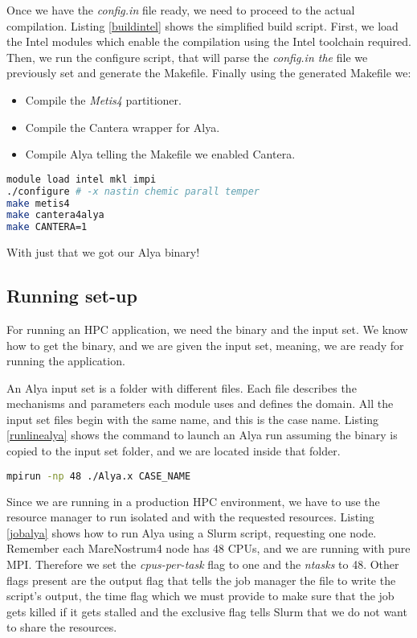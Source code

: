 Once we have the \textit{config.in} file ready, we need to proceed to the actual compilation. Listing \ref{buildintel} shows the simplified build script. First, we load the Intel modules which enable the compilation using the Intel toolchain required. Then, we run the configure script, that will parse the \textit{config.in the} file we previously set and generate the Makefile. Finally using the generated Makefile we:

\begin{itemize}
  \item Compile the \textit{Metis4} partitioner.
  \item Compile the Cantera wrapper for Alya.
  \item Compile Alya telling the Makefile we enabled Cantera.
\end{itemize}

\begin{lstlisting}[language=sh, caption={Building Alya}, label={buildintel}]
module load intel mkl impi
./configure # -x nastin chemic parall temper
make metis4
make cantera4alya 
make CANTERA=1
\end{lstlisting}

With just that we got our Alya binary!

\subsection{Running set-up}

For running an HPC application, we need the binary and the input set. We know how to get the binary, and we are given the input set, meaning, we are ready for running the application.

An Alya input set is a folder with different files. Each file describes the mechanisms and parameters each module uses and defines the domain. All the input set files begin with the same name, and this is the case name. Listing \ref{runlinealya} shows the command to launch an Alya run assuming the binary is copied to the input set folder, and we are located inside that folder.

\begin{lstlisting}[language=sh, caption={Running Alya with 48 processes.}, label={runlinealya}]
mpirun -np 48 ./Alya.x CASE_NAME
\end{lstlisting}


Since we are running in a production HPC environment, we have to use the resource manager to run isolated and with the requested resources. Listing \ref{jobalya} shows how to run Alya using a Slurm script, requesting one node. Remember each MareNostrum4 node has 48 CPUs, and we are running with pure MPI. Therefore we set the \textit{cpus-per-task} flag to one and the \textit{ntasks} to 48. Other flags present are the output flag that tells the job manager the file to write the script's output, the time flag which we must provide to make sure that the job gets killed if it gets stalled and the exclusive flag tells Slurm that we do not want to share the resources.

